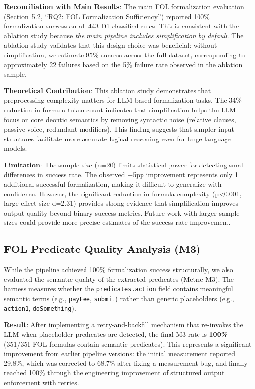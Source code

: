 \textbf{Reconciliation with Main Results}: The main FOL formalization evaluation (Section~5.2, ``RQ2: FOL Formalization Sufficiency'') reported 100\% formalization success on all 443 D1 classified rules. This is consistent with the ablation study because \textit{the main pipeline includes simplification by default}. The ablation study validates that this design choice was beneficial: without simplification, we estimate 95\% success across the full dataset, corresponding to approximately 22 failures based on the 5\% failure rate observed in the ablation sample.

\textbf{Theoretical Contribution}: This ablation study demonstrates that preprocessing complexity matters for LLM-based formalization tasks. The 34\% reduction in formula token count indicates that simplification helps the LLM focus on core deontic semantics by removing syntactic noise (relative clauses, passive voice, redundant modifiers). This finding suggests that simpler input structures facilitate more accurate logical reasoning even for large language models.

\textbf{Limitation}: The sample size (n=20) limits statistical power for detecting small differences in success rate. The observed +5pp improvement represents only 1 additional successful formalization, making it difficult to generalize with confidence. However, the significant reduction in formula complexity (p<0.001, large effect size d=2.31) provides strong evidence that simplification improves output quality beyond binary success metrics. Future work with larger sample sizes could provide more precise estimates of the success rate improvement.

\subsection{FOL Predicate Quality Analysis (M3)}
\label{sec:m3-predicate-quality}

While the pipeline achieved 100\% formalization success structurally, we also evaluated the semantic quality of the extracted predicates (Metric M3). The harness measures whether the \texttt{predicates.action} field contains meaningful semantic terms (e.g., \texttt{payFee}, \texttt{submit}) rather than generic placeholders (e.g., \texttt{action1}, \texttt{doSomething}).

\textbf{Result}: After implementing a retry-and-backfill mechanism that re-invokes the LLM when placeholder predicates are detected, the final M3 rate is \textbf{100\%} (351/351 FOL formulas contain semantic predicates). This represents a significant improvement from earlier pipeline versions: the initial measurement reported 29.8\%, which was corrected to 68.7\% after fixing a measurement bug, and finally reached 100\% through the engineering improvement of structured output enforcement with retries.

